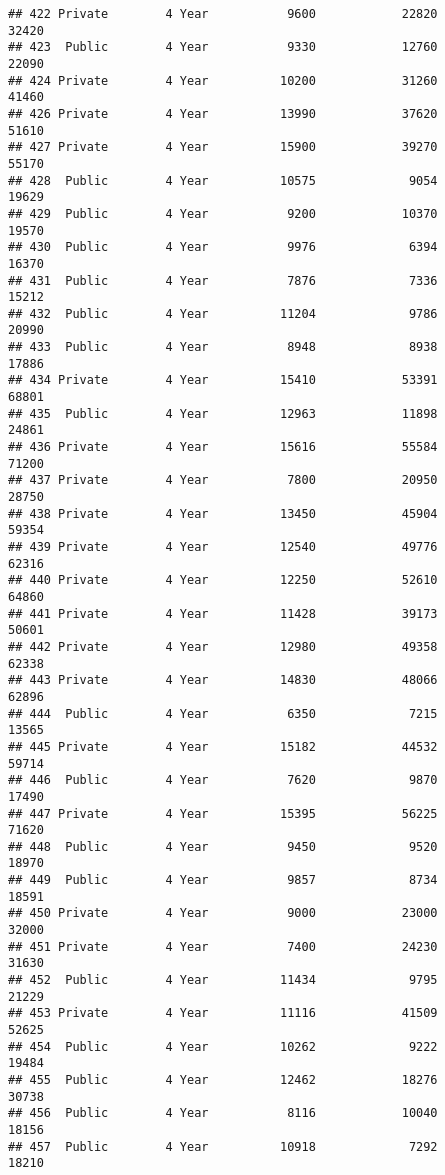 \documentclass[
]{article}
\begin{document}
\begin{verbatim}
## 422 Private        4 Year           9600            22820          32420
## 423  Public        4 Year           9330            12760          22090
## 424 Private        4 Year          10200            31260          41460
## 426 Private        4 Year          13990            37620          51610
## 427 Private        4 Year          15900            39270          55170
## 428  Public        4 Year          10575             9054          19629
## 429  Public        4 Year           9200            10370          19570
## 430  Public        4 Year           9976             6394          16370
## 431  Public        4 Year           7876             7336          15212
## 432  Public        4 Year          11204             9786          20990
## 433  Public        4 Year           8948             8938          17886
## 434 Private        4 Year          15410            53391          68801
## 435  Public        4 Year          12963            11898          24861
## 436 Private        4 Year          15616            55584          71200
## 437 Private        4 Year           7800            20950          28750
## 438 Private        4 Year          13450            45904          59354
## 439 Private        4 Year          12540            49776          62316
## 440 Private        4 Year          12250            52610          64860
## 441 Private        4 Year          11428            39173          50601
## 442 Private        4 Year          12980            49358          62338
## 443 Private        4 Year          14830            48066          62896
## 444  Public        4 Year           6350             7215          13565
## 445 Private        4 Year          15182            44532          59714
## 446  Public        4 Year           7620             9870          17490
## 447 Private        4 Year          15395            56225          71620
## 448  Public        4 Year           9450             9520          18970
## 449  Public        4 Year           9857             8734          18591
## 450 Private        4 Year           9000            23000          32000
## 451 Private        4 Year           7400            24230          31630
## 452  Public        4 Year          11434             9795          21229
## 453 Private        4 Year          11116            41509          52625
## 454  Public        4 Year          10262             9222          19484
## 455  Public        4 Year          12462            18276          30738
## 456  Public        4 Year           8116            10040          18156
## 457  Public        4 Year          10918             7292          18210

\end{verbatim}
\end{document}

